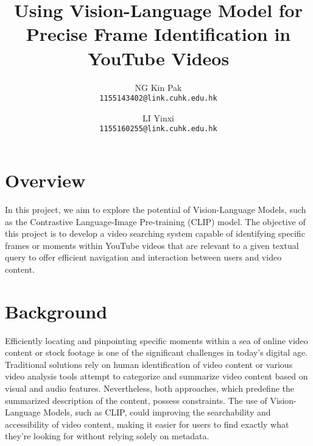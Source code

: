 \documentclass[11pt]{article}
\title{Using Vision-Language Model for Precise Frame Identification in YouTube Videos}
\author{ NG Kin Pak\\
        \texttt{1155143402@link.cuhk.edu.hk}\and
        LI Yinxi\\
        \texttt{1155160255@link.cuhk.edu.hk}}
\begin{document}
\maketitle

\section{Overview}
In this project, we aim to explore the potential of Vision-Language Models, such as the 
Contrastive Language-Image Pre-training (CLIP) model. The objective of this project is to develop 
a video searching system capable of identifying specific frames or moments within YouTube videos that 
are relevant to a given textual query to offer efficient navigation and interaction between users and video content.

\section{Background}
Efficiently locating and pinpointing specific moments within a sea of online 
video content or stock footage is one of the significant challenges in today’s digital age. 
Traditional solutions rely on human identification of video content or various video analysis tools attempt 
to categorize and summarize video content based on visual and audio features. Nevertheless, 
both approaches, which predefine the summarized description of the content, possess constraints. 
The use of Vision-Language Models, such as CLIP, could improving the searchability and accessibility of video content, 
making it easier for users to find exactly what they're looking for without relying solely on metadata. 
\end{document}
